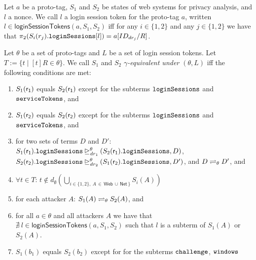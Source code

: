 \begin{theorem}
  \begin{definition}
    Let $a$ be a proto-tag, $S_1$ and $S_2$ be states of \uppresso web
    systems for privacy analysis, and $l$ a nonce. We call $l$ a login
    session token for the proto-tag $a$, written
    $l \in \mathsf{loginSessionTokens}(a,S_1,S_2)$ iff for any
    $i \in \{1,2\}$ and any $j \in \{1,2\}$ we have that
    $\proj{2}{S_i(r_j).\str{loginSessions}[l]} = a[ID_{dr_j}/ R]$.
  \end{definition}
  
  \begin{definition}\label{def:eq-of-states}
    Let $\theta$ be a set of proto-tags and 
    $L$ be a set of login session tokens.
    Let $T:=\{t\mid [t]R\in \theta\}$. 
    We call $S_1$ and $S_2$ \emph{$\gamma$-equivalent under 
    $(\theta, L)$} iff the following conditions are met:
    \begin{enumerate}
    \item\label{eqs:r1} $S_1(\fAP{r_1})$ equals $S_2(\fAP{r_1})$ except
      for the subterms $\str{loginSessions}$ and $\str{serviceTokens}$, and
    \item\label{eqs:r2} $S_1(\fAP{r_2})$ equals $S_2(\fAP{r_2})$ except
      for the subterms $\str{loginSessions}$ and $\str{serviceTokens}$, and
    \item\label{eqs:logsess} for two sets of terms $D$ and $D'$:
      $\logsessminus{S_1(\fAP{r_1}).\str{loginSessions}}{S_2(\fAP{r_1}).\str{loginSessions}}{\theta}{\mi{dr}_1}{D}$,
      $\logsessminus{S_2(\fAP{r_2}).\str{loginSessions}}{S_1(\fAP{r_2}).\str{loginSessions}}{\theta}{\mi{dr}_2}{D'}$,
      and $D \prototagequiv{\theta} D'$, and
    \item\label{eqs:att-not-t} $\forall t \in T$:
      $t \not\in d_\emptyset(\bigcup_{i \in \{1,2\},\ A\, \in\, \mathsf{Web}\, \cup \,
      \mathsf{Net}\, 
      \}}S_i(A))$
    \item\label{eqs:att} for each attacker $A$:
      $S_1(A) \prototagequiv{\theta} S_2(A)$, and
    \item\label{eqs:att-not-l} for all $a\in\theta$ and all attackers $A$ we have that
      $\nexists\ l \in \mathsf{loginSessionTokens}(a,S_1,S_2)$ such that
      $l$ is a subterm of $S_1(A)$ or $S_2(A)$.
    \item\label{eqs:b} $S_1(b_1)$ equals $S_2(b_2)$ except for for the
      subterms $\str{challenge}$, $\str{windows}$

\end{enumerate}
\end{definition}
\end{theorem}
